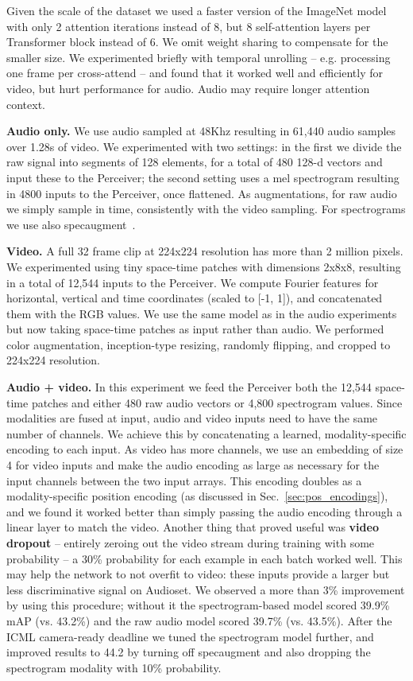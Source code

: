 Given the scale of the dataset we used a faster version of the ImageNet model with only 2 attention iterations instead of 8, but 8 self-attention layers per Transformer block instead of 6. We omit weight sharing to compensate for the smaller size. We experimented briefly with temporal unrolling -- e.g. processing one frame per cross-attend -- and found that it worked well and efficiently for video, but hurt performance for audio. Audio may require longer attention context.

 \textbf{Audio only.} We use audio sampled at 48Khz resulting in 61,440 audio samples over 1.28s of video. We experimented with two settings: in the first we divide the raw signal into segments of 128 elements, for a total of 480 128-d vectors and input these to the Perceiver; the second setting uses a mel spectrogram resulting in 4800 inputs to the Perceiver, once flattened. As augmentations, for raw audio we simply sample in time, consistently with the video sampling. For spectrograms we use also  specaugment~\cite{park2019specaugment}.

 \textbf{Video.} A full 32 frame clip at 224x224 resolution has more than 2 million pixels.  We experimented using tiny space-time patches with dimensions 2x8x8, resulting in a total of 12,544 inputs to the Perceiver. We compute Fourier features for horizontal, vertical and time coordinates (scaled to [-1, 1]), and concatenated them with the RGB values. We use the same model as in the audio experiments but now taking space-time patches as input rather than audio. We performed color augmentation, inception-type resizing, randomly flipping, and cropped to 224x224 resolution.

 \textbf{Audio + video.} In this experiment we feed the Perceiver both the 12,544 space-time patches and either 480 raw audio vectors or 4,800 spectrogram values. Since modalities are fused at input, audio and video inputs need to have the same number of channels. We achieve this by concatenating a learned, modality-specific encoding to each input. As video has more channels, we use an embedding of size 4 for video inputs and make the audio encoding as large as necessary for the input channels between the two input arrays. This encoding doubles as a modality-specific position encoding (as discussed in Sec.~\ref{sec:pos_encodings}), and we found it worked better than simply passing the audio encoding through a linear layer to match the video. Another thing that proved useful was \textbf{video dropout} -- entirely zeroing out the video stream during training with some probability -- a 30\% probability for each example in each batch worked well. This may help the network to not overfit to video: these inputs provide a larger but less discriminative signal on Audioset. We observed a more than 3\% improvement by using this procedure; without it the spectrogram-based model scored 39.9\% mAP (vs. 43.2\%) and the raw audio model scored 39.7\% (vs. 43.5\%). After the ICML camera-ready deadline we tuned the spectrogram model further, and improved results to 44.2 by turning off specaugment and also dropping the spectrogram modality with 10\% probability.

